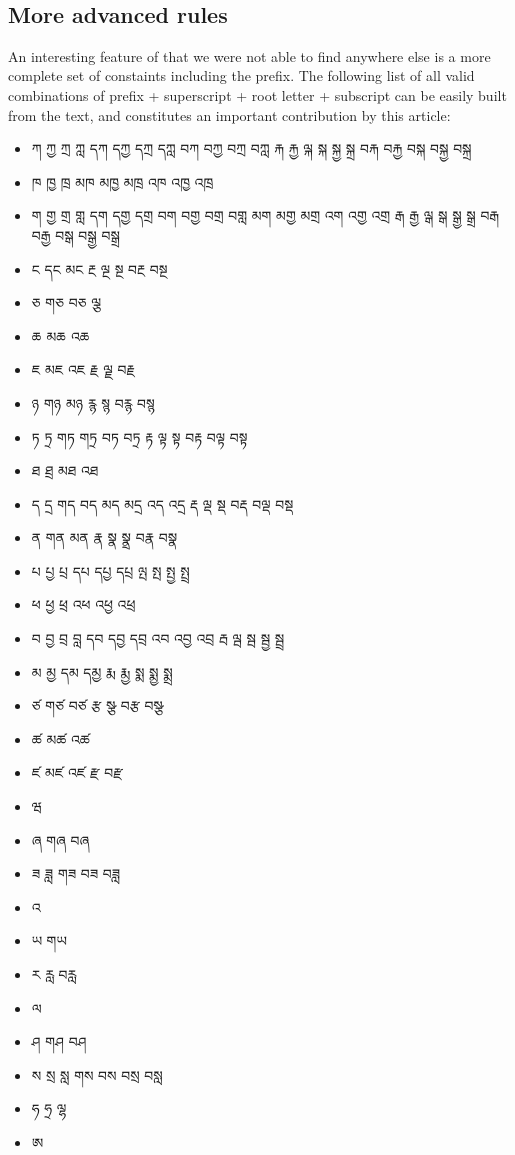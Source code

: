 \documentclass[%
a4paper,%
pagesize,%
12pt,%
parskip=off,%
bibliography=totoc,%
numbers=noenddot,%
DIV=12,%
twoside=semi,%
headings=normal%
]{scrartcl}
\begin{document}
­\subsection{More advanced rules}

An interesting feature of \cite{TsheshabGrammarTopics} that we were not able to find anywhere else is a more complete set of constaints including the prefix. The following list of all valid combinations of prefix + superscript + root letter + subscript can be easily built from the text, and constitutes an important contribution by this article:

\begin{itemize}
\item ཀ ཀྱ ཀྲ ཀླ དཀ དཀྱ དཀྲ དཀླ བཀ བཀྱ བཀྲ བཀླ རྐ རྐྱ ལྐ སྐ སྐྱ སྐྲ བརྐ བརྐྱ བསྐ བསྐྱ བསྐྲ
\item ཁ ཁྱ ཁྲ མཁ མཁྱ མཁྲ འཁ འཁྱ འཁྲ
\item ག གྱ གྲ གླ དག དགྱ དགྲ བག བགྱ བགྲ བགླ མག མགྱ མགྲ འག འགྱ འགྲ རྒ རྒྱ ལྒ སྒ སྒྱ སྒྲ བརྒ བརྒྱ བསྒ བསྒྱ བསྒྲ
\item ང དང མང རྔ ལྔ སྔ བརྔ བསྔ
\item ཅ གཅ བཅ ལྕ
\item ཆ མཆ འཆ
\item ཇ མཇ འཇ རྗ ལྗ བརྗ
\item ཉ གཉ མཉ རྙ སྙ བརྙ བསྙ
\item ཏ ཏྲ གཏ གཏྲ བཏ བཏྲ རྟ ལྟ སྟ བརྟ བལྟ བསྟ
\item ཐ ཐྲ མཐ འཐ
\item ད དྲ གད བད མད མདྲ འད འདྲ རྡ ལྡ སྡ བརྡ བལྡ བསྡ
\item ན གན མན རྣ སྣ སྣྲ བརྣ བསྣ
\item པ པྱ པྲ དཔ དཔྱ དཔྲ ལྤ སྤ སྤྱ སྤྲ
\item ཕ ཕྱ ཕྲ འཕ འཕྱ འཕྲ
\item བ བྱ བྲ བླ དབ དབྱ དབྲ འབ འབྱ འབྲ རྦ ལྦ སྦ སྦྱ སྦྲ
\item མ མྱ དམ དམྱ རྨ རྨྱ སྨ སྨྱ སྨྲ
\item ཙ གཙ བཙ རྩ སྩ བརྩ བསྩ
\item ཚ མཚ འཚ
\item ཛ མཛ འཛ རྫ བརྫ
\item ཝ
\item ཞ གཞ བཞ
\item ཟ ཟླ གཟ བཟ བཟླ
\item འ
\item ཡ གཡ
\item ར རླ བརླ
\item ལ
\item ཤ གཤ བཤ
\item ས སྲ སླ གས བས བསྲ བསླ
\item ཧ ཧྲ ལྷ
\item ཨ
\end{itemize}
\end{document}
